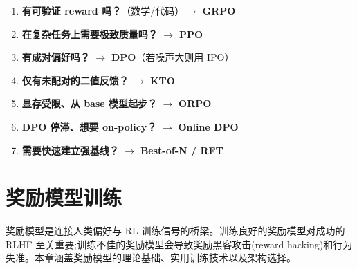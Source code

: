 \begin{keybox}
\begin{enumerate}
  \item \textbf{有可验证 reward 吗？}（数学/代码）$\rightarrow$ \textbf{GRPO}
  \item \textbf{在复杂任务上需要极致质量吗？} $\rightarrow$ \textbf{PPO}
  \item \textbf{有成对偏好吗？} $\rightarrow$ \textbf{DPO}（若噪声大则用 IPO）
  \item \textbf{仅有未配对的二值反馈？} $\rightarrow$ \textbf{KTO}
  \item \textbf{显存受限、从 base 模型起步？} $\rightarrow$ \textbf{ORPO}
  \item \textbf{DPO 停滞、想要 on-policy？} $\rightarrow$ \textbf{Online DPO}
  \item \textbf{需要快速建立强基线？} $\rightarrow$ \textbf{Best-of-N / RFT}
\end{enumerate}
\end{keybox}

\chapter{奖励模型训练}
\label{sec:reward-models}

奖励模型是连接人类偏好与 RL 训练信号的桥梁。训练良好的奖励模型对成功的 RLHF 至关重要;训练不佳的奖励模型会导致奖励黑客攻击(reward hacking)和行为失准。本章涵盖奖励模型的理论基础、实用训练技术以及架构选择。

